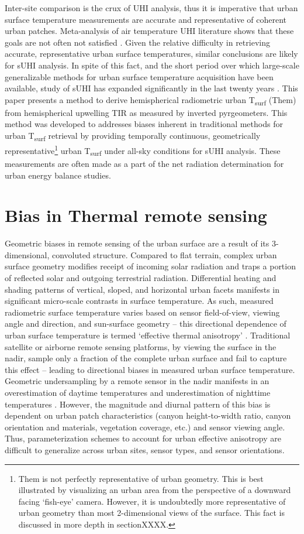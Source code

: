 Inter-site comparison is the crux of UHI analysis, thus it is imperative that urban surface temperature measurements are accurate and representative of coherent urban patches. Meta-analysis of air temperature UHI literature shows that these goals are not often not satisfied \cite{Stewart2011}. Given the relative difficulty in retrieving accurate, representative urban surface temperatures, similar conclusions are likely for sUHI analysis. In spite of this fact, and the short period over which large-scale generalizable methods for urban surface temperature acquisition have been available, study of sUHI has expanded significantly in the last twenty years \cite{Peng2012,Voogt2003}. This paper presents a method to derive hemispherical radiometric urban T\textsubscript{surf} (Them) from hemispherical upwelling TIR as measured by inverted pyrgeometers. This method was developed to addresses biases inherent in traditional methods for urban T\textsubscript{surf} retrieval by providing temporally continuous, geometrically representative\footnote{Them is not perfectly representative of urban geometry. This is best illustrated by visualizing an urban area from the perspective of a downward facing ‘fish-eye’ camera. However, it is undoubtedly more representative of urban geometry than most 2-dimensional views of the surface. This fact is discussed in more depth in sectionXXXX.}  urban T\textsubscript{surf} under all-sky conditions for sUHI analysis. These measurements are often made as a part of the net radiation determination for urban energy balance studies.

\section{Bias in Thermal remote sensing}
Geometric biases in remote sensing of the urban surface are a result of its 3-dimensional, convoluted structure. Compared to flat terrain, complex urban surface geometry modifies receipt of incoming solar radiation and traps a portion of reflected solar and outgoing terrestrial radiation. Differential heating and shading patterns of vertical, sloped, and horizontal urban facets manifests in significant micro-scale contrasts in surface temperature. As such, measured radiometric surface temperature varies based on sensor field-of-view, viewing angle and direction, and sun-surface geometry – this directional dependence of urban surface temperature is termed ‘effective thermal anisotropy’ \cite{Voogt1998a}. Traditional satellite or airborne remote sensing platforms, by viewing the surface in the nadir, sample only a fraction of the complete urban surface and fail to capture this effect – leading to directional biases in measured urban surface temperature. Geometric undersampling by a remote sensor in the nadir manifests in an overestimation of daytime temperatures and underestimation of nighttime temperatures \cite{Adderley2015}. However, the magnitude and diurnal pattern of this bias is dependent on urban patch characteristics (canyon height-to-width ratio, canyon orientation and materials, vegetation coverage, etc.) and sensor viewing angle. Thus, parameterization schemes to account for urban effective anisotropy are difficult to generalize across urban sites, sensor types, and sensor orientations.


